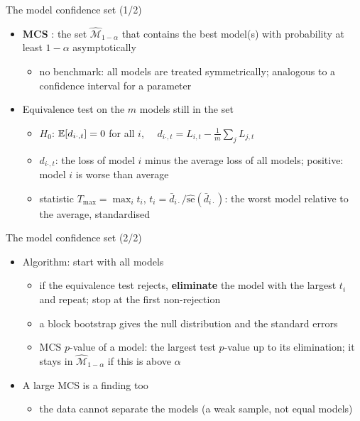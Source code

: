 \begin{frame}{The model confidence set (1/2)}
\itemsize{\small}
\begin{itemize}
    \item \textbf{MCS} : the set $\hat{\mathcal M}_{1-\alpha}$ that contains the best model(s) with probability at least $1 - \alpha$ asymptotically
    \begin{itemize}
        \item no benchmark: all models are treated symmetrically; analogous to a confidence interval for a parameter
    \end{itemize}
    \item Equivalence test on the $m$ models still in the set
    \begin{itemize}
        \item $H_0$: $\mathbb{E}[d_{i\cdot,t}] = 0$ for all $i$, $\quad d_{i\cdot,t} = L_{i,t} - \frac1m\sum_j L_{j,t}$
        \item $d_{i\cdot,t}$: the loss of model $i$ minus the average loss of all models; positive: model $i$ is worse than average
        \item statistic $T_{\max} = \max_i t_i$, $t_i = \bar d_{i\cdot}/\widehat{\mathrm{se}}(\bar d_{i\cdot})$: the worst model relative to the average, standardised
    \end{itemize}
\end{itemize}
\end{frame}

\begin{frame}{The model confidence set (2/2)}
\itemsize{\small}
\begin{itemize}
    \item Algorithm: start with all models
    \begin{itemize}
        \item if the equivalence test rejects, \textbf{eliminate} the model with the largest $t_i$ and repeat; stop at the first non-rejection
        \item a block bootstrap gives the null distribution and the standard errors
        \item MCS $p$-value of a model: the largest test $p$-value up to its elimination; it stays in $\hat{\mathcal M}_{1-\alpha}$ if this is above $\alpha$
    \end{itemize}
    \item A large MCS is a finding too
    \begin{itemize}
        \item the data cannot separate the models (a weak sample, not equal models)
    \end{itemize}
\end{itemize}
\end{frame}

